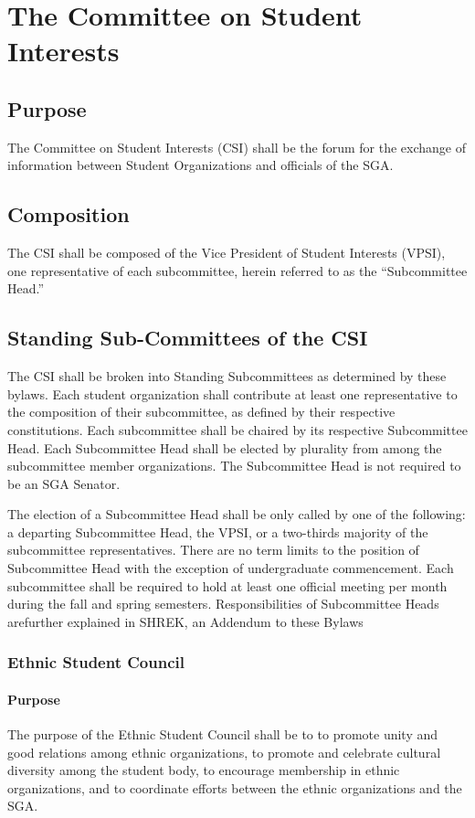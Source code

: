 \documentclass[12pt]{scrreprt}
\begin{document}
\section{The Committee on Student Interests} \label{sec:csi_representative}

\subsection{Purpose}
The Committee on Student Interests (CSI) shall be the forum for the exchange of
information between Student Organizations and officials of the SGA.

\subsection{Composition}
The CSI shall be composed of the Vice President of Student Interests (VPSI), one
representative of each subcommittee, herein referred to as the “Subcommittee Head.”

\subsection{Standing Sub-Committees of the CSI} \label{sec:csi_subcommittees}
The CSI shall be broken into Standing Subcommittees as determined by these bylaws. Each
student organization shall contribute at least one representative to the composition of their
subcommittee, as defined by their respective constitutions. Each subcommittee shall be
chaired by its respective Subcommittee Head. Each Subcommittee Head shall be elected by
plurality from among the subcommittee member organizations. The Subcommittee Head is
not required to be an SGA Senator.


The election of a Subcommittee Head shall be only called by one of the following: a departing Subcommittee Head, the VPSI, or a two-thirds majority of the subcommittee representatives. There are no term limits to the position of Subcommittee Head with the
exception of undergraduate commencement. Each subcommittee shall be required to hold at least one official meeting per month during
the fall and spring semesters. Responsibilities of Subcommittee Heads arefurther explained in SHREK, an Addendum to these Bylaws

\subsubsection{Ethnic Student Council}

\paragraph{Purpose}
The purpose of the Ethnic Student Council shall be to to promote unity and good relations among ethnic organizations, to promote and celebrate cultural diversity
among the student body, to encourage membership in ethnic organizations, and to coordinate efforts between the ethnic organizations and the SGA.
\end{document}
